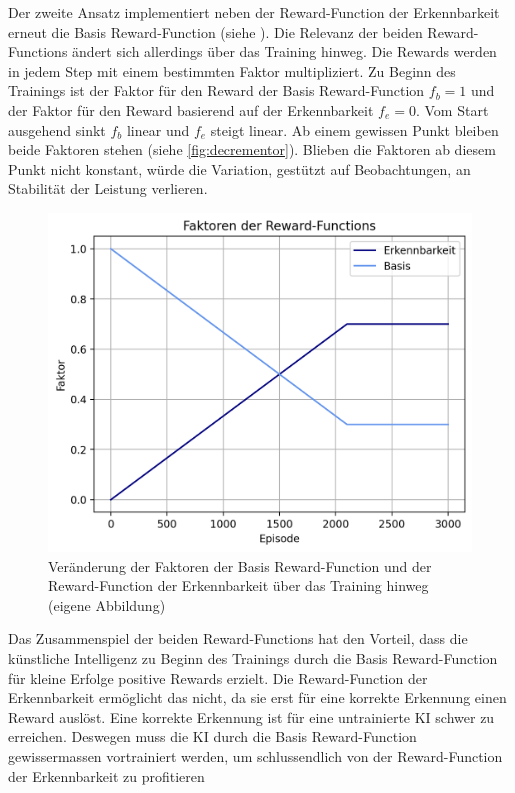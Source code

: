 Der zweite Ansatz implementiert neben der Reward-Function der Erkennbarkeit
erneut die Basis Reward-Function (siehe ). Die Relevanz
der beiden Reward-Functions ändert sich allerdings über das Training hinweg. Die
Rewards werden in jedem Step mit einem bestimmten Faktor multipliziert. Zu
Beginn des Trainings ist der Faktor für den Reward der Basis Reward-Function
$f_b = 1$ und der Faktor für den Reward basierend auf der Erkennbarkeit $f_e =
0$. Vom Start ausgehend sinkt $f_b$ linear und $f_e$ steigt linear. Ab einem
gewissen Punkt bleiben beide Faktoren stehen (siehe \autoref{fig:decrementor}).
Blieben die Faktoren ab diesem Punkt nicht konstant, würde die Variation,
gestützt auf Beobachtungen, an Stabilität der Leistung verlieren.

\begin{figure}[!ht]
  \centering
  \includegraphics[width=\textwidth-2cm]{images/methode/decrementor.png}
  \caption{Veränderung der Faktoren der Basis Reward-Function und der Reward-Function der Erkennbarkeit über das Training hinweg (eigene Abbildung)}
  \label{fig:decrementor}
\end{figure}

Das Zusammenspiel der beiden Reward-Functions hat den Vorteil, dass die
künstliche Intelligenz zu Beginn des Trainings durch die Basis Reward-Function
für kleine Erfolge positive Rewards erzielt. Die Reward-Function der
Erkennbarkeit ermöglicht das nicht, da sie erst für eine korrekte Erkennung
einen Reward auslöst. Eine korrekte Erkennung ist für eine untrainierte KI
schwer zu erreichen. Deswegen muss die KI durch die Basis Reward-Function
gewissermassen vortrainiert werden, um schlussendlich von der Reward-Function
der Erkennbarkeit zu profitieren


